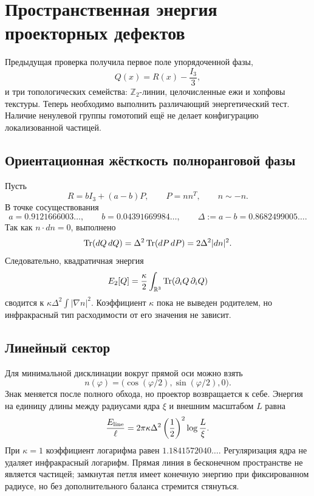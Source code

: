 \chapter{Пространственная энергия проекторных дефектов}

Предыдущая проверка получила первое поле упорядоченной фазы,
\begin{equation}
 Q(x)=R(x)-\frac{I_3}{3},
\end{equation}
и три топологических семейства: $\mathbb Z_2$-линии, целочисленные ежи и
хопфовы текстуры. Теперь необходимо выполнить различающий энергетический
тест. Наличие ненулевой группы гомотопий ещё не делает конфигурацию
локализованной частицей.

\section{Ориентационная жёсткость полноранговой фазы}

Пусть
\begin{equation}
 R=bI_3+(a-b)P,
 \qquad P=nn^T,
 \qquad n\sim-n.
 \label{eq:v6-spatial-Q-uniaxial-form}
\end{equation}
В точке сосуществования
\begin{equation}
 a=0.9121666003\ldots,
 \qquad b=0.04391669984\ldots,
 \qquad \Delta:=a-b=0.8682499005\ldots.
\end{equation}
Так как $n\cdot dn=0$, выполнено
\begin{equation}
 \operatorname{Tr}(dQ\,dQ)=\Delta^2\operatorname{Tr}(dP\,dP)
 =2\Delta^2|dn|^2.
 \label{eq:v6-spatial-Q-gradient-identity}
\end{equation}
Следовательно, квадратичная энергия
\begin{equation}
 E_2[Q]=\frac\kappa2\int_{\mathbb R^3}\operatorname{Tr}(\partial_iQ\,\partial_iQ)
\end{equation}
сводится к $\kappa\Delta^2\int|\nabla n|^2$. Коэффициент $\kappa$ пока не
выведен родителем, но инфракрасный тип расходимости от его значения не
зависит.

\section{Линейный сектор}

Для минимальной дисклинации вокруг прямой оси можно взять
\begin{equation}
 n(\varphi)=
 \bigl(\cos(\varphi/2),\sin(\varphi/2),0\bigr).
\end{equation}
Знак меняется после полного обхода, но проектор возвращается к себе.
Энергия на единицу длины между радиусами ядра $\xi$ и внешним масштабом
$L$ равна
\begin{equation}
 \frac{E_{\rm line}}{\ell}
 =2\pi\kappa\Delta^2\left(\frac12\right)^2
 \log\frac L\xi.
 \label{eq:v6-line-disclination-energy}
\end{equation}
При $\kappa=1$ коэффициент логарифма равен
$1.1841572040\ldots$. Регуляризация ядра не удаляет инфракрасный
логарифм. Прямая линия в бесконечном пространстве не является частицей;
замкнутая петля имеет конечную энергию при фиксированном радиусе, но без
дополнительного баланса стремится стянуться.

